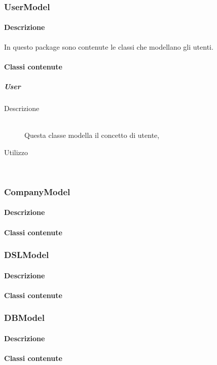 \subsubsection{UserModel}
\paragraph{Descrizione}
In questo package sono contenute le classi che modellano gli utenti.
\paragraph{Classi contenute}
\subparagraph{User}
\begin{description}
\item[Descrizione] \hfill \\
Questa classe modella il concetto di utente, 
\item[Utilizzo] \hfill \\
\end{description}
\subsubsection{CompanyModel}
\paragraph{Descrizione}
\paragraph{Classi contenute}

\subsubsection{DSLModel}
\paragraph{Descrizione}
\paragraph{Classi contenute}

\subsubsection{DBModel}
\paragraph{Descrizione}
\paragraph{Classi contenute}